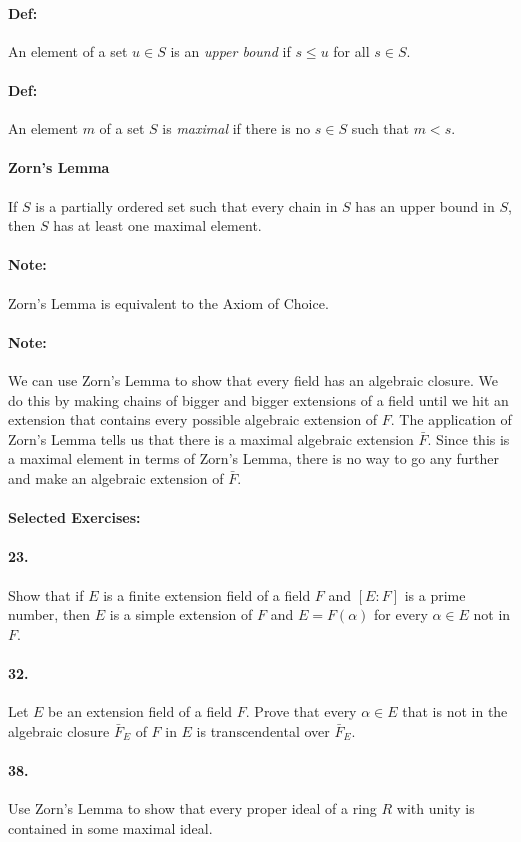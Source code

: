 \documentclass[10pt,a4paper]{article}
\begin{document}
\paragraph{Def:} An element of a set $u \in S$ is an \textit{upper bound} if $ s \leq u$ for all $s \in S$.

\paragraph{Def:} An element $m$ of a set $S$ is \textit{maximal} if there is no $s \in S$ such that $m < s$.

\paragraph{Zorn's Lemma} If $S$ is a partially ordered set such that every chain in $S$ has an upper bound in $S$, then $S$ has at least one maximal element.

\paragraph{Note:} Zorn's Lemma is equivalent to the Axiom of Choice.

\paragraph{Note:} We can use Zorn's Lemma to show that every field has an algebraic closure. We do this by making chains of bigger and bigger extensions of a field until we hit an extension that contains every possible algebraic extension of $F$. The application of Zorn's Lemma tells us that there is a maximal algebraic extension $\bar{F}$. Since this is a maximal element in terms of Zorn's Lemma, there is no way to go any further and make an algebraic extension of $\bar{F}$. 

\paragraph{Selected Exercises:}

\paragraph{23.} Show that if $E$ is a finite extension field of a field $F$ and $[E:F]$ is a prime number, then $E$ is a simple extension of $F$ and $E = F(\alpha)$ for every $\alpha \in E$ not in $F$.

\paragraph{32.} Let $E$ be an extension field of a field $F$. Prove that every $\alpha \in E$ that is not in the algebraic closure $\bar{F}_E$ of $F$ in $E$ is transcendental over $\bar{F}_E$.

\paragraph{38.} Use Zorn's Lemma to show that every proper ideal of a ring $R$ with unity is contained in some maximal ideal.
\end{document}
